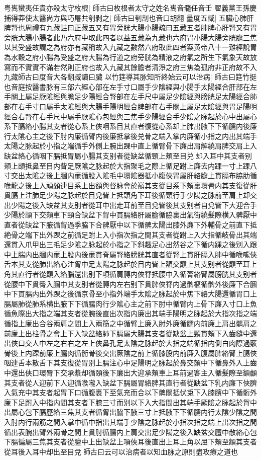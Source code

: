 粤嶲蠻夷任貴亦殺太守枚根|{
	師古曰枚根者太守之姓名嶲音髓任音壬}
翟義黨王孫慶捕得莽使太醫尚方與巧屠共刳剥之|{
	師古曰刳剖也音口胡翻}
量度五臧|{
	五臟心肺肝脾腎也周禮有九藏註曰正藏五又有胃旁胱大腸小腸疏曰五藏五者肺脾心肝腎又有胃旁胱大腸小腸者此乃六府中取此四者以益五藏為九藏也六府胃小腸大腸旁胱膽三焦以其受盛故謂之為府亦有藏稱故入九藏之數然六府取此四者案黄帝八十一難經說胃為水穀之府小腸為受盛之府大腸為行道之府旁胱為精液之府氣之所生下氣象天故放寫而不實實不滿若然則正府也故入九藏其餘膽者清淨之府三焦為孤府非正府故不入九藏師古曰度音大各翻臧讀曰臟}
以竹筳導其脉知所終始云可以治病|{
	師古曰筳竹挺也音庭按醫書脉有三部六經心部在左手寸口屬手少隂經與小腸手太陽經合肝部在左手關上屬足厥隂經與膽足少陽經合腎部在左手尺中屬足少隂經與膀胱足太陽經合肺部在右手寸口屬手太隂經與大腸手陽明經合脾部在右手關上屬足太隂經與胃足陽明經合右腎在右手尺中屬手厥隂心包經與三焦手少陽經合手少隂之脉起於心中出屬心系下膈絡小腸其支者從心系上俠咽系目其直者復從心系却上肺出腋下下循臑内後廉行太隂心主之後下肘内廉循臂内後廉抵掌後兑骨之端入掌内廉循小指之内出其端手太陽之脉起於小指之端循手外側上腕出踝中直上循臂骨下廉出肩解繞肩脾交肩上入缺盆絡心循咽下膈抵胃屬小腸其支别者從缺盆循頸上頰至目兑却入耳中其支者别頰上䪼抵鼻至目内眥足厥隂之脉起於大指聚毛之際上循足跗上廉去内踝一寸上踝八寸交出太隂之後上膕内亷循股入隂毛中環隂器抵小腹俠胃屬肝絡膽上貫膈布脇肋循㗋龍之後上入頑顙連目系上出額與督脉會於巔其支從目系下頰裏環脣内其支復從肝貫膈上注肺足少陽之脉起於目兌眥上抵頭角下耳後循頸行手少陽之脉前至肩上却交出少陽之後入缺盆其支别者從耳中出走耳前至目兌眥後其支别者自兌眥下大迎合手少陽於䪼下交頰車下頸合缺盆下胷中貫膈絡肝屬膽循脇裏出氣街繞髮際横入髀厭中直者從缺盆下腋循胷過季脇下合髀厭中以下循髀太陽出膝外亷下外輔骨之前直下抵絶骨之端下出外踝之前循足跗上入小指次指之間其支者從跗上入大指循岐骨出其端還貫入爪甲出三毛足少隂之脉起於小指之下斜趣足心出然谷之下循内踝之後别入跟中上腨内出膕内亷上股内後亷貫脊屬腎絡膀胱其直者從腎上貫肝膈入肺中循㗋嚨俠舌本其支從肺出絡心注胷中足太陽之脉起於目内眥上額交巔上其支别者從巔至耳上角其直行者從巔入絡腦還出别下項循肩膊内俠脊抵腰中入循膂絡腎屬膀胱其支别者從腰中下貫臀入膕中其支别者從膊内左右别下貫脾俠脊内過髀樞循髀外後廉下合膕中下貫膈内出外踝之後循京骨至小指外端手太隂之脉起於中焦下絡大腸還循胃口上膈屬肺從肺系横出腋下下循臑肉行少隂心主之前下肘中循臂内上骨下廉入寸口上魚循魚際出大指之端其支者從腕後直出次指内廉出其端手陽明之脉起於大指次指之端循指上廉出合谷兩肩之間上入兩筋之中循臂上廉入肘外廉循臑内前廉上肩出髃肩之前廉上出柱骨之會上下入缺盆絡肺下膈屬大腸其支者從缺盆上頸貫頰下入齒縫中還出俠口交人中左之右右之左上俠鼻孔足太隂之脉起於大指之端循指内側白肉際過竅骨後上内踝前廉上臑肉循䯒骨後交出厥隂之前上循膝股内前廉入腹屬脾絡腎上膈俠咽連舌本散舌下其支復從胃别上膈注心中足陽明之脉起於鼻交頞中下循鼻外入上齒中還出俠口環脣下交承漿却循頤後下廉出大迎承頰車上耳前過客主入循髮際至額顱其支者從人迎前下人迎循㗋嚨入缺盆下膈屬胃絡脾其直行者從缺盆下乳内廉下俠臍入氣充中其支者起胃下口循腹裹下至氣充而合以下髀關抵伏兎下入膝臏中下循䯒外廉下足跗入中指内間其支者下膝三寸而别以下入大指間出其端手厥隂之脉起於胷中出屬心包下膈歷絡三焦其支者循胷出脇下腋三寸上抵腋下下循臑内行太隂少隂之間入肘内行兩筋之間入掌中循中指出其端手少隂之脉起於小指次指之端上出次指之間循出表腕出臂外兩骨之間上貫肘循臑内上肩交出足少陽之後入缺盆交膻中散絡心包下膈徧屬三焦其支者從膻中上出缺盆上項俠耳後直出上耳上角以屈下頰至䪼其支者從耳後入耳中却出至目兌師古曰云可以治病者以知血脉之原則盡攻療之道也}
